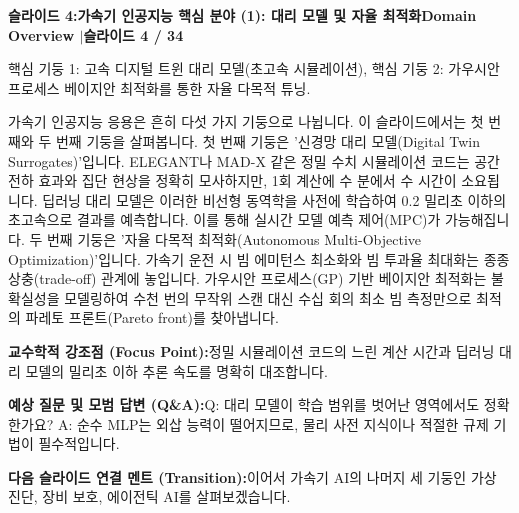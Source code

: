 \documentclass[11pt,a4paper]{article}
\begin{document}
\clearpage
\hypertarget{slide.4}{}
{}
\noindent\begin{tcolorbox}[colback=navy,colframe=navy,left=6pt,right=6pt,top=3pt,bottom=3pt,boxrule=0pt,arc=2pt]
{\large\bfseries\color{white}슬라이드 4:\enspace 가속기 인공지능 핵심 분야 (1): 대리 모델 및 자율 최적화}\hfill{\footnotesize\bfseries\color{white!85!lightbg}Domain Overview \enspace$|$\enspace 슬라이드 4 / 34}
\end{tcolorbox}
\vspace{0.2em}
\begin{tcolorbox}[colback=lightbg,colframe=bordergray,title={\footnotesize\bfseries\color{darkgray}슬라이드 시각 구성 요약},fontupper=\small,left=6pt,right=6pt,top=2.5pt,bottom=2.5pt,boxrule=0.6pt,arc=2.5pt]
핵심 기둥 1: 고속 디지털 트윈 대리 모델(초고속 시뮬레이션), 핵심 기둥 2: 가우시안 프로세스 베이지안 최적화를 통한 자율 다목적 튜닝.
\end{tcolorbox}
\vspace{0.2em}
\begin{tcolorbox}[colback=white,colframe=primaryblue,title={\footnotesize\bfseries\color{white}발표자 구두 대본 (Spoken Script)},fontupper=\small,left=6pt,right=6pt,top=3pt,bottom=3pt,boxrule=0.8pt,arc=2.5pt]
가속기 인공지능 응용은 흔히 다섯 가지 기둥으로 나뉩니다. 이 슬라이드에서는 첫 번째와 두 번째 기둥을 살펴봅니다. 첫 번째 기둥은 '신경망 대리 모델(Digital Twin Surrogates)'입니다. ELEGANT나 MAD-X 같은 정밀 수치 시뮬레이션 코드는 공간전하 효과와 집단 현상을 정확히 모사하지만, 1회 계산에 수 분에서 수 시간이 소요됩니다. 딥러닝 대리 모델은 이러한 비선형 동역학을 사전에 학습하여 0.2 밀리초 이하의 초고속으로 결과를 예측합니다. 이를 통해 실시간 모델 예측 제어(MPC)가 가능해집니다. 두 번째 기둥은 '자율 다목적 최적화(Autonomous Multi-Objective Optimization)'입니다. 가속기 운전 시 빔 에미턴스 최소화와 빔 투과율 최대화는 종종 상충(trade-off) 관계에 놓입니다. 가우시안 프로세스(GP) 기반 베이지안 최적화는 불확실성을 모델링하여 수천 번의 무작위 스캔 대신 수십 회의 최소 빔 측정만으로 최적의 파레토 프론트(Pareto front)를 찾아냅니다.
\end{tcolorbox}
\vspace{0.2em}
\begin{tcolorbox}[colback=lightbg,colframe=bordergray,left=6pt,right=6pt,top=3pt,bottom=3pt,boxrule=0.6pt,arc=2.5pt]
\small
\noindent\textbf{\color{navy}교수학적 강조점 (Focus Point):}\enspace 정밀 시뮬레이션 코드의 느린 계산 시간과 딥러닝 대리 모델의 밀리초 이하 추론 속도를 명확히 대조합니다.\par\vspace{0.3em}
\noindent\textbf{\color{successgreen}예상 질문 및 모범 답변 (Q\&A):}\enspace Q: 대리 모델이 학습 범위를 벗어난 영역에서도 정확한가요? A: 순수 MLP는 외삽 능력이 떨어지므로, 물리 사전 지식이나 적절한 규제 기법이 필수적입니다.\par\vspace{0.3em}
\noindent\textbf{\color{accent}다음 슬라이드 연결 멘트 (Transition):}\enspace 이어서 가속기 AI의 나머지 세 기둥인 가상 진단, 장비 보호, 에이전틱 AI를 살펴보겠습니다.
\end{tcolorbox}
\end{document}
